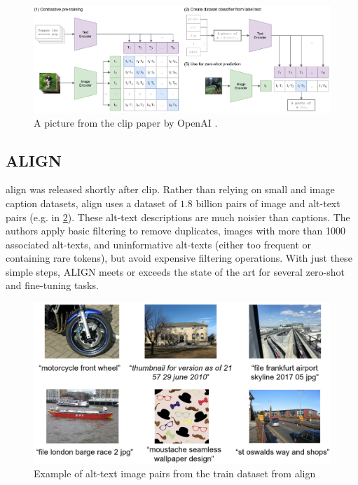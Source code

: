         \begin{figure}[]
            \centering
            \includegraphics[width=\textwidth]{Images/crossmodalnetworks/OpenAICLIP.png}
            \caption{A picture from the \acrshort{clip} paper by OpenAI \cite{clip}.}
            \label{fig:crossmodalnetworks:openaiclip}
        \end{figure}

        \subsection{ALIGN
            \label{section:align}}
        \acrfull{align}\cite{ALIGN} was released shortly after \acrshort{clip}.
        Rather than relying on small and image caption datasets, \acrshort{align} uses a dataset of \(1.8\) billion pairs of image and alt-text pairs (e.g. in \cref{fig:crossmodalnetworks:alignepairs}).
        These alt-text descriptions are much noisier than captions.
        The authors apply basic filtering to remove duplicates, images with more than 1000 associated alt-texts, and uninformative alt-texts (either too frequent or containing rare tokens), but avoid expensive filtering operations.
        With just these simple steps, ALIGN meets or exceeds the state of the art for several zero-shot and fine-tuning tasks.
        \begin{figure}
            \centering
            \includegraphics[width=\textwidth]{Images/crossmodalnetworks/examplepicsalign.png}
            \caption{Example of alt-text image pairs from the train dataset from \acrshort{align}\cite{ALIGN}}
            \label{fig:crossmodalnetworks:alignepairs}
        \end{figure}

